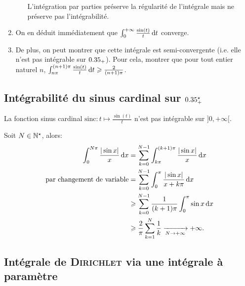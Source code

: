\begin{preuve}
\begin{enumerate}
\begin{itemize}
            \begin{remarque}
                L'intégration par parties préserve la régularité de l'intégrale mais ne préserve pas l'intégrabilité.
            \end{remarque}
        \end{itemize}
        \item On en déduit immédiatement que $\int_{0}^{+ \infty} \frac{\sin (t)}{t} \, \mathrm{d} t$ converge.
        \item De plus, on peut montrer que cette intégrale est semi-convergente (i.e. elle n'est pas intégrable sur $0.35_+$). Pour cela, montrer que pour tout entier naturel $n$, $\int_{n \pi}^{(n+1) \pi} \frac{\sin(t)}{t} \, \mathrm{d} t \geqslant \frac{2}{(n+1) \pi}$. 
    \end{enumerate}
\end{preuve}

\subsection{Intégrabilité du sinus cardinal sur  \texorpdfstring{$0.35^\star_+$}{R+*}}

\begin{prop}{}
    La fonction sinus cardinal $\mathrm{sinc}:t \mapsto \frac{\sin(t)}{t}$ n'est pas intégrable sur $]0, +\infty[$.
\end{prop}

\begin{preuve}
    Soit $N \in \mathbb{N}^\star$, alors:
    \begin{align*}
        \int_0^{N \pi} \frac{|\sin x|}{x} \, \mathrm{d} x &= \sum_{k=0}^{N-1} \int_{k \pi}^{(k+1) \pi} \frac{|\sin x|}{x} \, \mathrm{d} x \\
        \text{ par changement de variable} &= \sum_{k=0}^{N-1} \int_0^\pi \frac{|\sin x|}{x + k \pi} \, \mathrm{d} x \\
        &\geqslant \sum_{k=0}^{N-1} \frac{1}{(k+1) \pi} \int_0^\pi \sin x \, \mathrm{d} x \\
        &\geqslant \frac{2}{\pi} \sum_{k=1}^N \frac{1}{k} \xrightarrow[N \to + \infty]{} + \infty.
    \end{align*}
\end{preuve}

\subsection{Intégrale de \textsc{Dirichlet} via une intégrale à paramètre}

